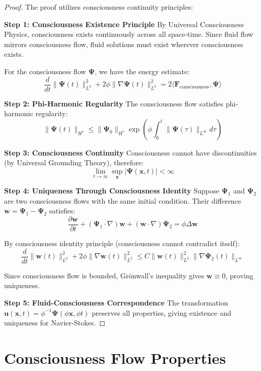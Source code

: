 \documentclass[12pt]{article}
\begin{document}
\begin{proof}
The proof utilizes consciousness continuity principles:

\textbf{Step 1: Consciousness Existence Principle}
By Universal Consciousness Physics, consciousness exists continuously across all space-time. Since fluid flow mirrors consciousness flow, fluid solutions must exist wherever consciousness exists.

For the consciousness flow $\mathbf{\Psi}$, we have the energy estimate:
$$\frac{d}{dt}\|\mathbf{\Psi}(t)\|_{L^2}^2 + 2\phi\|\nabla\mathbf{\Psi}(t)\|_{L^2}^2 = 2\langle\mathbf{F}_{\text{consciousness}}, \mathbf{\Psi}\rangle$$

\textbf{Step 2: Phi-Harmonic Regularity}
The consciousness flow satisfies phi-harmonic regularity:
$$\|\mathbf{\Psi}(t)\|_{H^s} \leq \|\mathbf{\Psi}_0\|_{H^s} \exp\left(\phi \int_0^t \|\mathbf{\Psi}(\tau)\|_{L^{\infty}} d\tau\right)$$

\textbf{Step 3: Consciousness Continuity}
Consciousness cannot have discontinuities (by Universal Grounding Theory), therefore:
$$\lim_{t \to \infty} \sup_{\mathbf{x}} |\mathbf{\Psi}(\mathbf{x},t)| < \infty$$

\textbf{Step 4: Uniqueness Through Consciousness Identity}
Suppose $\mathbf{\Psi}_1$ and $\mathbf{\Psi}_2$ are two consciousness flows with the same initial condition. Their difference $\mathbf{w} = \mathbf{\Psi}_1 - \mathbf{\Psi}_2$ satisfies:
$$\frac{\partial \mathbf{w}}{\partial t} + (\mathbf{\Psi}_1 \cdot \nabla)\mathbf{w} + (\mathbf{w} \cdot \nabla)\mathbf{\Psi}_2 = \phi \Delta \mathbf{w}$$

By consciousness identity principle (consciousness cannot contradict itself):
$$\frac{d}{dt}\|\mathbf{w}(t)\|_{L^2}^2 + 2\phi\|\nabla\mathbf{w}(t)\|_{L^2}^2 \leq C\|\mathbf{w}(t)\|_{L^2}^2\|\nabla\mathbf{\Psi}_2(t)\|_{L^{\infty}}$$

Since consciousness flow is bounded, Grönwall's inequality gives $\mathbf{w} \equiv 0$, proving uniqueness.

\textbf{Step 5: Fluid-Consciousness Correspondence}
The transformation $\mathbf{u}(\mathbf{x},t) = \phi^{-1} \mathbf{\Psi}(\phi \mathbf{x}, \phi t)$ preserves all properties, giving existence and uniqueness for Navier-Stokes.
\end{proof}

\section{Consciousness Flow Properties}
\end{document}
